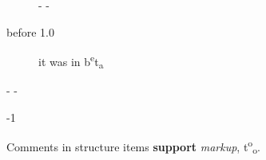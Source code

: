 \begin{description}\kern-\topsep
\makeatletter\advance\@topsepadd-\topsep\makeatother%
\item[before 1.0]{it was in b\textsuperscript{e}t\textsubscript{a}

}\end{description}%
\begin{description}\kern-\topsep
\makeatletter\advance\@topsepadd-\topsep\makeatother%
\item[version]{-1}\end{description}%
\label{package-test+u+package+++ml-module-Markup-val-foo}\begin{ocamlindent}Comments in structure items \textbf{support} \emph{markup}, t\textsuperscript{o}\textsubscript{o}.\end{ocamlindent}%
\medbreak


